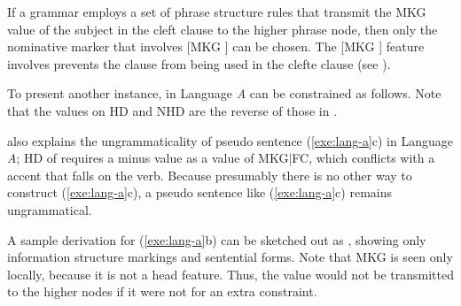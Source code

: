 \noindent If a grammar employs a set of phrase structure rules that
transmit the MKG value of the subject in the cleft clause to the
higher phrase node, then only the nominative marker that involves [MKG
  ] can be chosen.  The [MKG ] feature \nun
involves prevents the clause from being used in the clefte clause (see
 ).


To present another instance,  in Language \textit{A}
can be constrained as follows. Note that the values on HD and NHD are
the reverse of those in .


\noindent {} also explains the ungrammaticality
of pseudo sentence (\ref{exe:lang-a}c) in Language \textit{A}; HD of
 requires a minus value as a value of MKG{$\mid$}FC,
which conflicts with a  accent that falls on the verb. Because
presumably there is no other way to construct (\ref{exe:lang-a}c), a
pseudo sentence like (\ref{exe:lang-a}c) remains ungrammatical.



\noindent A sample derivation for (\ref{exe:lang-a}b) can be sketched
out as , showing only information
structure markings and sentential forms. Note that MKG is seen only
locally, because it is not a head feature. Thus, the value would not
be transmitted to the higher nodes if it were not for an extra
constraint.




